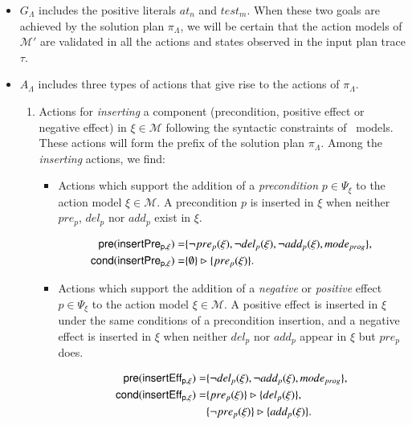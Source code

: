 \begin{itemize}
\item $G_{\Lambda}$ includes the positive literals $at_n$ and $test_m$. When these two goals are achieved by the solution plan $\pi_\Lambda$, we will be certain that the action models of $\mathcal{M'}$ are validated in all the actions and states observed in the input plan trace $\tau$.

\item $A_{\Lambda}$ includes three types of actions that give rise to the actions of $\pi_\Lambda$.
\begin{enumerate}
\item Actions for {\em inserting} a component (precondition, positive effect or negative effect) in $\xi \in \mathcal{M}$ following the syntactic constraints of \strips\ models. These actions will form the prefix of the solution plan $\pi_\Lambda$. Among the \emph{inserting} actions, we find:
\begin{itemize}
\item Actions which support the addition of a {\em precondition} $p\in \Psi_{\xi}$ to the action model $\xi\in\mathcal{M}$. A precondition $p$ is inserted in $\xi$ when neither $pre_p$, $del_p$ nor $add_p$ exist in $\xi$.

\begin{small}
\begin{align*}
\hspace*{7pt}\mathsf{pre}(\mathsf{insertPre_{p,\xi}})=&\{\neg pre_{p}(\xi), \neg del_{p}(\xi),\neg add_{p}(\xi), mode_{prog}\},\\
\mathsf{cond}(\mathsf{insertPre_{p,\xi}})=&\{\emptyset\}\rhd\{pre_{p}(\xi)\}.
\end{align*}
\end{small}

\item Actions which support the addition of a {\em negative} or {\em positive} effect $p\in \Psi_{\xi}$ to the action model $\xi\in\mathcal{M}$. A positive effect is inserted in $\xi$ under the same conditions of a precondition insertion, and a negative effect is inserted in $\xi$ when neither $del_p$ nor $add_p$ appear in $\xi$ but $pre_p$ does.

\begin{small}
\begin{align*}
\hspace*{7pt}\mathsf{pre}(\mathsf{insertEff_{p,\xi}})=&\{\neg del_{p}(\xi),\neg add_{p}(\xi), mode_{prog}\},\\
\mathsf{cond}(\mathsf{insertEff_{p,\xi}})=&\{pre_{p}(\xi)\}\rhd\{del_{p}(\xi)\},\\
& \{\neg pre_{p}(\xi)\}\rhd\{add_{p}(\xi)\}.
\end{align*}
\end{small}
\end{itemize}


\end{enumerate}
\end{itemize}
